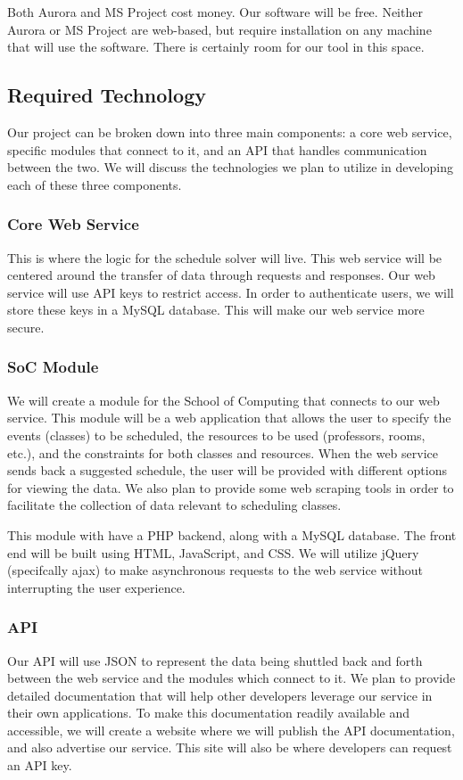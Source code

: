 \documentclass{extarticle}
\begin{document}
Both Aurora and MS Project cost money.  Our software will be free.  Neither Aurora or MS Project are web-based, but
require installation on any machine that will use the software.  There is certainly room for our tool in this
space.

\subsection{Required Technology}
Our project can be broken down into three main components:  a core web service, specific modules that connect to
it, and an API that handles communication between the two.  We will discuss the technologies we plan to utilize in
developing each of these three components.

\subsubsection{Core Web Service}
This is where the logic for the schedule solver will live.  This web service will be centered around the transfer
of data through requests and responses.  Our web service will use API keys to restrict access.  In order to
authenticate users, we will store these keys in a MySQL database.  This will make our web service more secure.

\subsubsection{SoC Module}
We will create a module for the School of Computing that connects to our web service.  This module will be a web
application that allows the user to specify the events (classes) to be scheduled, the resources to be used
(professors, rooms, etc.), and the constraints for both classes and resources.  When the web service sends back a
suggested schedule, the user will be provided with different options for viewing the data.  We also plan to provide
some web scraping tools in order to facilitate the collection of data relevant to scheduling classes.

This module with have a PHP backend, along with a MySQL database.  The front end will be built using HTML,
JavaScript, and CSS.  We will utilize jQuery (specifcally ajax) to make asynchronous requests to the web
service without interrupting the user experience.

\subsubsection{API}
Our API will use JSON to represent the data being shuttled back and forth between the web service and the modules
which connect to it.  We plan to provide detailed documentation that will help other developers leverage our
service in their own applications.  To make this documentation readily available and accessible, we will create a
website where we will publish the API documentation, and also advertise our service.  This site will also be where
developers can request an API key.
\end{document}
